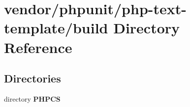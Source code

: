 \section{vendor/phpunit/php-\/text-\/template/build Directory Reference}
\label{dir_1022784827feabb08442374a66ab26e0}
\subsection*{Directories}
\begin{DoxyCompactItemize}
\item 
directory {\bf P\+H\+P\+C\+S}
\end{DoxyCompactItemize}
